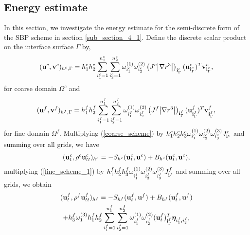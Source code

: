 \documentclass[a4paper]{article}
\begin{document}
\subsection{Energy estimate}


In this section, we investigate the energy estimate for the semi-discrete form of the SBP scheme in section \ref{sub_section_4_1}. Define the discrete scalar product on the interface surface $\Gamma$ by,
\begin{equation}\label{scalar_product_discrete_interface_c}
({\bf u}^c, {\bf v}^c)_{h^c,\Gamma} = h_1^ch_2^c\sum_{i_1^c=1}^{n_1^c}\sum_{i_2^c=1}^{n_2^c}\omega_{i_1^c}^{(1)}\omega_{i_2^c}^{(2)}\left(J^c\big|\nabla r^{3}\big|\right)_{{\bf i}^c_{\Gamma}}({\bf u}^c_{{\bf i}^c_{\Gamma}})^T{\bf v}_{{\bf i}^c_{\Gamma}}^c,
\end{equation}
for coarse domain $\Omega^c$ and
\begin{equation}\label{scalar_product_discrete_interface_f}
({\bf u}^f, {\bf v}^f)_{h^f,\Gamma} = h_1^fh_2^f\sum_{i_1^f=1}^{n_1^f}\sum_{i_2^f=1}^{n_2^f}\omega_{i_1^f}^{(1)}\omega_{i_2^f}^{(2)}\left(J^f\big|\nabla r^{3}\big|\right)_{{\bf i}^f_{\Gamma}}({\bf u}^f_{{\bf i}^f_{\Gamma}})^T{\bf v}_{{\bf i}^f_{\Gamma}}^f,
\end{equation}
for fine domain $\Omega^f$. Multiplying (\ref{coarse_scheme}) by $h_1^ch_2^ch_3^c\omega_{i_1^c}^{(1)}\omega_{i_2^c}^{(2)}\omega_{i_3^c}^{(3)}J_{{\bf i}^c}^c$ and summing over all grids, we have
\begin{equation}\label{coarse_simple}
({\bf u}_t^c, \rho^c{\bf u}_{tt}^c)_{h^c} = -S_{h^c}({\bf u}_t^c,{\bf u}^c) + B_{h^c}({\bf u}_t^c,{\bf u}^c),
\end{equation}
multiplying (\ref{fine_scheme_1}) by $h_1^fh_2^fh_3^f\omega_{i_1^f}^{(1)}\omega_{i_2^f}^{(2)}\omega_{i_3^f}^{(3)}J_{{\bf i}^f}^f$ and summing over all grids, we obtain
\begin{multline}\label{fine_simple}
({\bf u}_t^f, \rho^f{\bf u}_{tt}^f)_{h^f} = -S_{h^f}({\bf u}_t^f,{\bf u}^f) + B_{h^f}({\bf u}_t^f,{\bf u}^f) \\
+h_3^f\omega_1^{(3)}h_1^fh_2^f\sum_{i_1^f=1}^{n_1^f}\sum_{i_2^f=1}^{n_2^f}\omega_{i_1^f}^{(1)}\omega_{i_2^f}^{(2)}({\bf u}_t^f)_{{\bf i}^f_{\Gamma}}^{T}{\bm \eta}_{i_1^f,i_2^f},
\end{multline}
\end{document}
